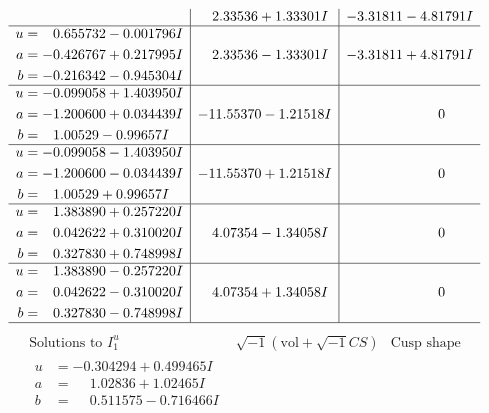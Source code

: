 \documentclass[1p]{elsarticle_modified}
\theoremstyle{definition}
\newcommand{\I}{\sqrt{-1}}
\begin{document}
$$\begin{array}{c|c|c}
 & \phantom{-}2.33536 + 1.33301 I & -3.31811 - 4.81791 I \\ \hline\begin{aligned}
u &= \phantom{-}0.655732 - 0.001796 I \\
a &= -0.426767 + 0.217995 I \\
b &= -0.216342 - 0.945304 I\end{aligned}
 & \phantom{-}2.33536 - 1.33301 I & -3.31811 + 4.81791 I \\ \hline\begin{aligned}
u &= -0.099058 + 1.403950 I \\
a &= -1.200600 + 0.034439 I \\
b &= \phantom{-}1.00529 - 0.99657 I\end{aligned}
 & -11.55370 - 1.21518 I & \phantom{-0.000000 } 0 \\ \hline\begin{aligned}
u &= -0.099058 - 1.403950 I \\
a &= -1.200600 - 0.034439 I \\
b &= \phantom{-}1.00529 + 0.99657 I\end{aligned}
 & -11.55370 + 1.21518 I & \phantom{-0.000000 } 0 \\ \hline\begin{aligned}
u &= \phantom{-}1.383890 + 0.257220 I \\
a &= \phantom{-}0.042622 + 0.310020 I \\
b &= \phantom{-}0.327830 + 0.748998 I\end{aligned}
 & \phantom{-}4.07354 - 1.34058 I & \phantom{-0.000000 } 0 \\ \hline\begin{aligned}
u &= \phantom{-}1.383890 - 0.257220 I \\
a &= \phantom{-}0.042622 - 0.310020 I \\
b &= \phantom{-}0.327830 - 0.748998 I\end{aligned}
 & \phantom{-}4.07354 + 1.34058 I & \phantom{-0.000000 } 0\\
 \hline 
 \end{array}$$\newpage$$\begin{array}{c|c|c}  
\text{Solutions to }I^u_{1}& \I (\text{vol} + \sqrt{-1}CS) & \text{Cusp shape}\\
 \hline 
\begin{aligned}
u &= -0.304294 + 0.499465 I \\
a &= \phantom{-}1.02836 + 1.02465 I \\
b &= \phantom{-}0.511575 - 0.716466 I\end{aligned}

\end{array}$$
\end{document}

